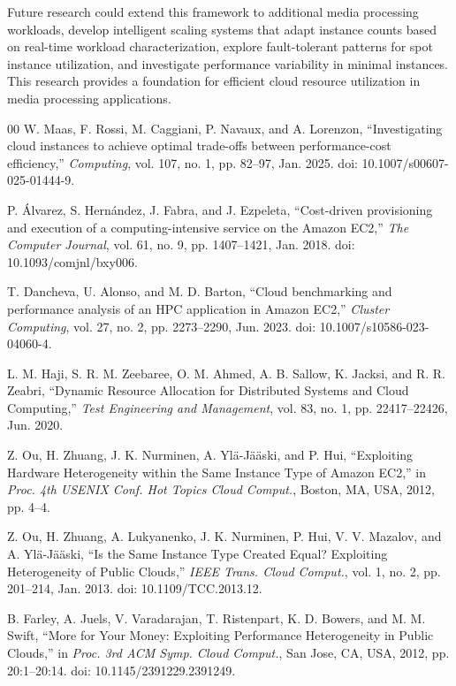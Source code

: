 \documentclass[conference]{IEEEtran}
\begin{document}
	Future research could extend this framework to additional media processing workloads, develop intelligent scaling systems that adapt instance counts based on real-time workload characterization, explore fault-tolerant patterns for spot instance utilization, and investigate performance variability in minimal instances. This research provides a foundation for efficient cloud resource utilization in media processing applications.
	\clearpage
	\begin{thebibliography}{00}
		 W. Maas, F. Rossi, M. Caggiani, P. Navaux, and A. Lorenzon, ``Investigating cloud instances to achieve optimal trade-offs between performance-cost efficiency,'' \emph{Computing}, vol. 107, no. 1, pp. 82--97, Jan. 2025. doi: 10.1007/s00607-025-01444-9.
		
		 P. Álvarez, S. Hernández, J. Fabra, and J. Ezpeleta, ``Cost-driven provisioning and execution of a computing-intensive service on the Amazon EC2,'' \emph{The Computer Journal}, vol. 61, no. 9, pp. 1407--1421, Jan. 2018. doi: 10.1093/comjnl/bxy006.
		
		 T. Dancheva, U. Alonso, and M. D. Barton, ``Cloud benchmarking and performance analysis of an HPC application in Amazon EC2,'' \emph{Cluster Computing}, vol. 27, no. 2, pp. 2273--2290, Jun. 2023. doi: 10.1007/s10586-023-04060-4.
		
		 L. M. Haji, S. R. M. Zeebaree, O. M. Ahmed, A. B. Sallow, K. Jacksi, and R. R. Zeabri, ``Dynamic Resource Allocation for Distributed Systems and Cloud Computing,'' \emph{Test Engineering and Management}, vol. 83, no. 1, pp. 22417--22426, Jun. 2020.
		
		 Z. Ou, H. Zhuang, J. K. Nurminen, A. Ylä-Jääski, and P. Hui, ``Exploiting Hardware Heterogeneity within the Same Instance Type of Amazon EC2,'' in \emph{Proc. 4th USENIX Conf. Hot Topics Cloud Comput.}, Boston, MA, USA, 2012, pp. 4--4.
		
		 Z. Ou, H. Zhuang, A. Lukyanenko, J. K. Nurminen, P. Hui, V. V. Mazalov, and A. Ylä-Jääski, ``Is the Same Instance Type Created Equal? Exploiting Heterogeneity of Public Clouds,'' \emph{IEEE Trans. Cloud Comput.}, vol. 1, no. 2, pp. 201--214, Jan. 2013. doi: 10.1109/TCC.2013.12.
		
		 B. Farley, A. Juels, V. Varadarajan, T. Ristenpart, K. D. Bowers, and M. M. Swift, ``More for Your Money: Exploiting Performance Heterogeneity in Public Clouds,'' in \emph{Proc. 3rd ACM Symp. Cloud Comput.}, San Jose, CA, USA, 2012, pp. 20:1--20:14. doi: 10.1145/2391229.2391249.
		

\end{thebibliography}
\end{document}

